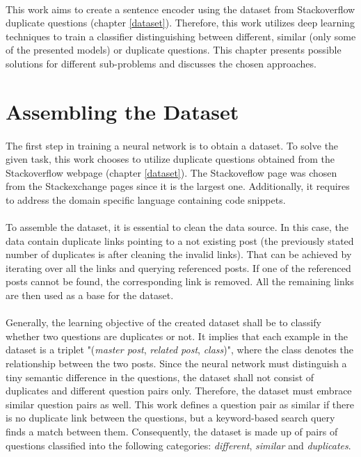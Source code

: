 \paragraph{}
This work aims to create a sentence encoder using the dataset from Stackoverflow duplicate questions (chapter \ref{dataset}). Therefore, this work utilizes deep learning techniques to train a classifier distinguishing between different, similar (only some of the presented models) or duplicate questions. This chapter presents possible solutions for different sub-problems and discusses the chosen approaches.

\section{Assembling the Dataset}\label{assembling_the_dataset}
\paragraph{}
The first step in training a neural network is to obtain a dataset. To solve the given task, this work chooses to utilize duplicate questions obtained from the Stackoverflow webpage (chapter \ref{dataset}). The Stackoveflow page was chosen from the Stackexchange pages since it is the largest one. Additionally, it requires to address the domain specific language containing code snippets.

\paragraph{}
To assemble the dataset, it is essential to clean the data source. In this case, the data contain duplicate links pointing to a not existing post (the previously stated number of duplicates is after cleaning the invalid links).  That can be achieved by iterating over all the links and querying referenced posts. If one of the referenced posts cannot be found, the corresponding link is removed. All the remaining links are then used as a base for the dataset.

\paragraph{}
Generally, the learning objective of the created dataset shall be to classify whether two questions are duplicates or not. It implies that each example in the dataset is a triplet "(\textit{master post}, \textit{related post}, \textit{class})", where the class denotes the relationship between the two posts. Since the neural network must distinguish a tiny semantic difference in the questions, the dataset shall not consist of duplicates and different question pairs only. Therefore, the dataset must embrace similar question pairs as well. This work defines a question pair as similar if there is no duplicate link between the questions, but a keyword-based search query finds a match between them. Consequently, the dataset is made up of pairs of questions classified into the following categories: \textit{different}, \textit{similar} and \textit{duplicates}.

